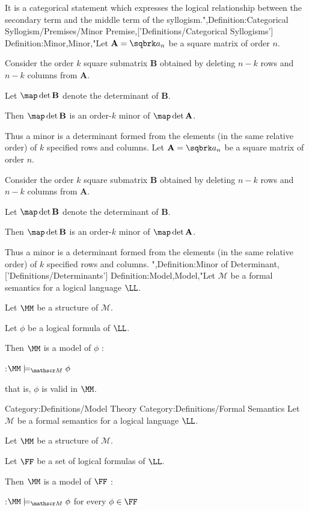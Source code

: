 It is a categorical statement which expresses the logical relationship between the secondary term and the middle term of the syllogism.",Definition:Categorical Syllogism/Premises/Minor Premise,['Definitions/Categorical Syllogisms']
Definition:Minor,Minor,"Let $\mathbf A = \sqbrk a_n$ be a square matrix of order $n$.

Consider the order $k$ square submatrix $\mathbf B$ obtained by deleting $n - k$ rows and $n - k$ columns from $\mathbf A$.


Let $\map \det {\mathbf B}$ denote the determinant of $\mathbf B$.

Then $\map \det {\mathbf B}$ is an order-$k$ minor of $\map \det {\mathbf A}$.


Thus a minor is a determinant formed from the elements (in the same relative order) of $k$ specified rows and columns.
Let $\mathbf A = \sqbrk a_n$ be a square matrix of order $n$.

Consider the order $k$ square submatrix $\mathbf B$ obtained by deleting $n - k$ rows and $n - k$ columns from $\mathbf A$.


Let $\map \det {\mathbf B}$ denote the determinant of $\mathbf B$.

Then $\map \det {\mathbf B}$ is an order-$k$ minor of $\map \det {\mathbf A}$.


Thus a minor is a determinant formed from the elements (in the same relative order) of $k$ specified rows and columns.
",Definition:Minor of Determinant,['Definitions/Determinants']
Definition:Model,Model,"Let $\mathscr M$ be a formal semantics for a logical language $\LL$.

Let $\MM$ be a structure of $\mathscr M$.


Let $\phi$ be a logical formula of $\LL$.

Then $\MM$ is a model of $\phi$ :

:$\MM \models_{\mathscr M} \phi$

that is,  $\phi$ is valid in $\MM$.




Category:Definitions/Model Theory
Category:Definitions/Formal Semantics
Let $\mathscr M$ be a formal semantics for a logical language $\LL$.

Let $\MM$ be a structure of $\mathscr M$.


Let $\FF$ be a set of logical formulas of $\LL$.

Then $\MM$ is a model of $\FF$ :

:$\MM \models_{\mathscr M} \phi$ for every $\phi \in \FF$


